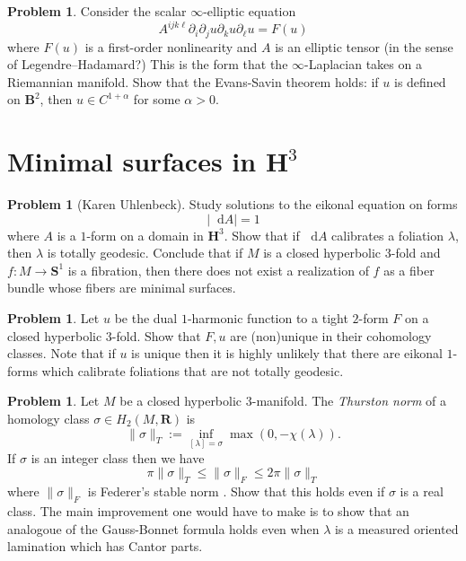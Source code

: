 \documentclass[reqno,11pt]{amsart}
\newcommand{\RR}{\mathbf{R}}
\newcommand{\Hyp}{\mathbf H}
\newcommand{\Sph}{\mathbf S}
\newcommand{\Ball}{\mathbf{B}}
\newcommand*\dif{\mathop{}\!\mathrm{d}}
\newcommand{\dfn}[1]{\emph{#1}\index{#1}}
\theoremstyle{definition}
\newtheorem{problem}[theorem]{Problem}
\numberwithin{equation}{section}
\begin{document}
\begin{problem}
Consider the scalar $\infty$-elliptic equation 
$$A^{ijk\ell} \partial_i \partial_j u \partial_k u \partial_\ell u = F(u)$$
where $F(u)$ is a first-order nonlinearity and $A$ is an elliptic tensor (in the sense of Legendre--Hadamard?)
This is the form that the $\infty$-Laplacian takes on a Riemannian manifold.
Show that the Evans-Savin theorem \cite{Evans08} holds: if $u$ is defined on $\Ball^2$, then $u \in C^{1 + \alpha}$ for some $\alpha > 0$.
\end{problem}

\section{Minimal surfaces in \texorpdfstring{$\Hyp^3$}{hyperbolic 3-space}}
\begin{problem}[Karen Uhlenbeck]
Study solutions to the eikonal equation on forms 
$$|\dif A| = 1$$
where $A$ is a $1$-form on a domain in $\Hyp^3$.
Show that if $\dif A$ calibrates a foliation $\lambda$, then $\lambda$ is totally geodesic.
Conclude that if $M$ is a closed hyperbolic $3$-fold and $f: M \to \Sph^1$ is a fibration, then there does not exist a realization of $f$ as a fiber bundle whose fibers are minimal surfaces.
\end{problem}

\begin{problem}
Let $u$ be the dual $1$-harmonic function to a tight $2$-form $F$ on a closed hyperbolic $3$-fold.
Show that $F, u$ are (non)unique in their cohomology classes.
Note that if $u$ is unique then it is highly unlikely that there are eikonal $1$-forms which calibrate foliations that are not totally geodesic.
\end{problem}

\begin{problem}
Let $M$ be a closed hyperbolic $3$-manifold.
The \dfn{Thurston norm} of a homology class $\sigma \in H_2(M, \RR)$ is 
$$\|\sigma\|_T := \inf_{[\lambda] = \sigma} \max(0, -\chi(\lambda)).$$
If $\sigma$ is an integer class then we have 
$$\pi \|\sigma\|_T \leq \|\sigma\|_F \leq 2\pi \|\sigma\|_T$$
where $\|\sigma\|_F$ is Federer's stable norm \cite[Theorem 3.2]{Brock2017}.
Show that this holds even if $\sigma$ is a real class.
The main improvement one would have to make is to show that an analogoue of the Gauss-Bonnet formula holds even when $\lambda$ is a measured oriented lamination which has Cantor parts.
\end{problem}
\end{document}
